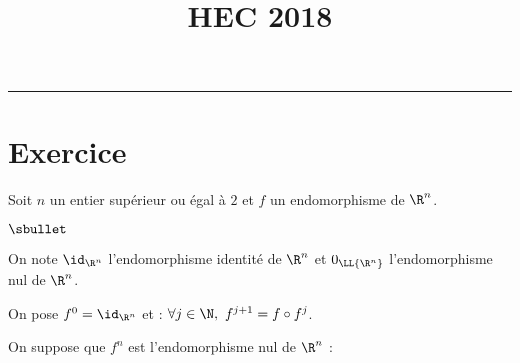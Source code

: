 \documentclass[11pt]{article}%
\title{\bf \vspace{-1.6cm} HEC 2018} %
\author{} %
\date{} %
\begin{document}
\maketitle %
\vspace{-1.2cm}\hrule %
\thispagestyle{fancy}

\vspace*{.4cm}

\section*{Exercice}

\noindent
Soit $n$ un entier supérieur ou égal à $2$ et $f$ un endomorphisme de
$\R^n$.
\begin{noliste}{$\sbullet$}
\item On note $\id_{\R^n}$ l'endomorphisme identité de $\R^n$ et
  $0_{\LL{\R^n}}$ l'endomorphisme nul de $\R^n$.

\item On pose $f^0=\id_{\R^n}$ et : $\forall j \in \N, \ f^{j+1}=f
  \circ f^j$.
  
\item On suppose que $f^n$ est l'endomorphisme nul de $\R^n$ : \
\end{noliste}
\end{document}
